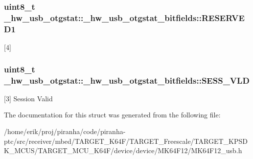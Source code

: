 \subsubsection[{\texorpdfstring{R\+E\+S\+E\+R\+V\+E\+D1}{RESERVED1}}]{\setlength{\rightskip}{0pt plus 5cm}uint8\+\_\+t \+\_\+hw\+\_\+usb\+\_\+otgstat\+::\+\_\+hw\+\_\+usb\+\_\+otgstat\+\_\+bitfields\+::\+R\+E\+S\+E\+R\+V\+E\+D1}\hypertarget{struct__hw__usb__otgstat_1_1__hw__usb__otgstat__bitfields_ac26a1ec348e13485fe57d127b55af563}{}\label{struct__hw__usb__otgstat_1_1__hw__usb__otgstat__bitfields_ac26a1ec348e13485fe57d127b55af563}
\mbox{[}4\mbox{]} 
\subsubsection[{\texorpdfstring{S\+E\+S\+S\+\_\+\+V\+LD}{SESS_VLD}}]{\setlength{\rightskip}{0pt plus 5cm}uint8\+\_\+t \+\_\+hw\+\_\+usb\+\_\+otgstat\+::\+\_\+hw\+\_\+usb\+\_\+otgstat\+\_\+bitfields\+::\+S\+E\+S\+S\+\_\+\+V\+LD}\hypertarget{struct__hw__usb__otgstat_1_1__hw__usb__otgstat__bitfields_a9369ed5ce40cc43d766495c399f39a13}{}\label{struct__hw__usb__otgstat_1_1__hw__usb__otgstat__bitfields_a9369ed5ce40cc43d766495c399f39a13}
\mbox{[}3\mbox{]} Session Valid 

The documentation for this struct was generated from the following file\+:\begin{DoxyCompactItemize}
\item 
/home/erik/proj/piranha/code/piranha-\/ptc/src/receiver/mbed/\+T\+A\+R\+G\+E\+T\+\_\+\+K64\+F/\+T\+A\+R\+G\+E\+T\+\_\+\+Freescale/\+T\+A\+R\+G\+E\+T\+\_\+\+K\+P\+S\+D\+K\+\_\+\+M\+C\+U\+S/\+T\+A\+R\+G\+E\+T\+\_\+\+M\+C\+U\+\_\+\+K64\+F/device/device/\+M\+K64\+F12/M\+K64\+F12\+\_\+usb.\+h\end{DoxyCompactItemize}
